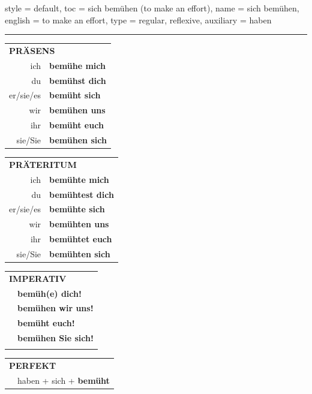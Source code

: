 \begin{verbentry}{
  style = {default},
  toc = {sich bemühen (to make an effort)},
  name = {sich bemühen},
  english = {to make an effort},
  type = {regular, reflexive},
  auxiliary = {haben}
}
 
    
     \vspace{5pt}

    \hrule
    
    \vspace{5pt}

  \begin{tabular}{rl}
     \multicolumn{2}{l}{\textbf{PRÄSENS} }\\
    ich & \textbf{bemühe mich}\\
    du & \textbf{bemühst dich}\\
    er/sie/es & \textbf{bemüht sich}\\
    wir & \textbf{bemühen uns}\\
    ihr & \textbf{bemüht euch}\\
    sie/Sie & \textbf{bemühen sich}\\
  \end{tabular}
  \hfill
     \begin{tabular}{rl}
    \multicolumn{2}{l}{\textbf{PRÄTERITUM} }\\
    ich & \textbf{bemühte mich}\\
    du & \textbf{bemühtest dich}\\
    er/sie/es & \textbf{bemühte sich}\\
    wir & \textbf{bemühten uns}\\
    ihr & \textbf{bemühtet euch}\\
    sie/Sie & \textbf{bemühten sich}\\
  \end{tabular}
  \hfill
  \begin{tabular}{rl}
     \multicolumn{2}{l}{\textbf{IMPERATIV} }\\
   & \textbf{bemüh(e) dich!}\\
   & \textbf{bemühen wir uns!}\\
   & \textbf{bemüht euch!}\\
   & \textbf{bemühen Sie sich!}\\
   & \vspace{10pt}
  \end{tabular}

    \vspace{10pt}

 \begin{tabular}{rl}
     \multicolumn{2}{l}{\textbf{PERFEKT}}\\
   & haben + sich + \textbf{bemüht}\\
  \end{tabular}
\hfill
   \begin{tabular}{rl}
   

\end{tabular}
\end{verbentry}
